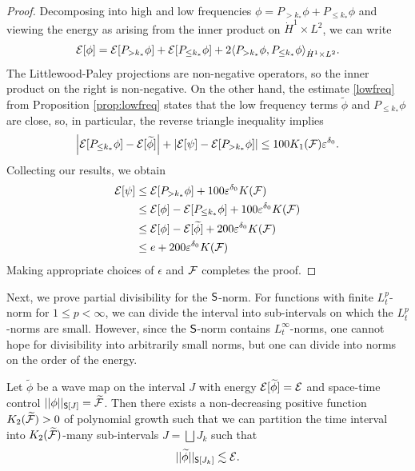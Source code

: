\begin{proof}
	Decomposing into high and low frequencies $\phi = P_{> k_*} \phi + P_{\leq k_*} \phi$ and viewing the energy as arising from the inner product on $\dot H^1 \times L^2$, we can write
		\[
			\mathcal E[\phi] = \mathcal E[P_{> k_*} \phi] + \mathcal E[P_{\leq k_*} \phi] + 2 \langle P_{> k_*} \phi, P_{\leq k_*} \phi \rangle_{\dot H^1 \times L^2}.
		\]
	The Littlewood-Paley projections are non-negative operators, so the inner product on the right is non-negative. On the other hand, the estimate \eqref{lowfreq} from Proposition \ref{prop:lowfreq} states that the low frequency terms $\widetilde \phi$ and $P_{\leq k_*} \phi$ are close, so, in particular, the reverse triangle inequality implies
		\[
			\left|\mathcal E[P_{\leq k_*} \phi] - \mathcal E[\widetilde \phi]\right| + \left|\mathcal E[\psi] - \mathcal E[P_{> k_*} \phi]\right| \leq 100K_1 (\mathcal F) \varepsilon^{\delta_0}. 
		\]
	Collecting our results, we obtain
		\begin{align*}
			\mathcal E[\psi]
				&\leq \mathcal E[P_{> k_*} \phi] + 100 \varepsilon^{\delta_0} K(\mathcal F) \\
				&\leq \mathcal E[\phi] - \mathcal E[P_{\leq k_*} \phi] + 100\varepsilon^{\delta_0} K(\mathcal F)\\
				&\leq \mathcal E[\phi] - \mathcal E[\widetilde \phi] + 200 \varepsilon^{\delta_0} K (\mathcal F) \\
				&\leq e +  200 \varepsilon^{\delta_0} K (\mathcal F)
		\end{align*}	
	Making appropriate choices of $\epsilon$ and $\mathcal F$ completes the proof. 	
\end{proof}

Next, we prove partial divisibility for the $\mathsf S$-norm. For functions with finite $L^p_t$-norm for $1 \leq p < \infty$, we can divide the interval into sub-intervals on which the $L^p_t$-norms are small. However, since the $\mathsf S$-norm contains $L^\infty_t$-norms, one cannot hope for divisibility into arbitrarily small norms, but one can divide into norms on the order of the energy. 


\begin{lemma}
	Let $\widetilde \phi$ be a wave map on the interval $J$ with energy $\mathcal E[\widetilde \phi] = \mathcal E$ and space-time control $||\phi||_{\mathsf S[J]} = \widetilde {\mathcal F}$. Then there exists a non-decreasing positive function $K_2 (\widetilde {\mathcal F}) > 0$ of polynomial growth such that we can partition the time interval into $K_2 (\widetilde {\mathcal F})$-many sub-intervals $J = \bigsqcup J_k$ such that 
		\begin{equation}
			||\widetilde \phi||_{\mathsf S[J_k]} \lesssim \mathcal E.\label{eq:divis}
		\end{equation}
\end{lemma}

